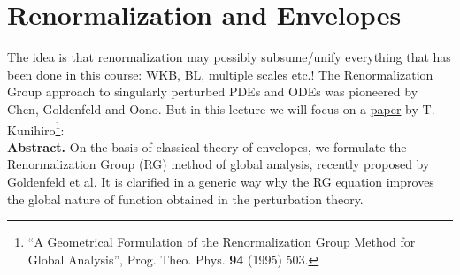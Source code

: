 \chapter{Renormalization and Envelopes}
The idea is that renormalization may possibly subsume/unify everything that has been done in this course: WKB, BL, multiple scales etc.! The Renormalization Group approach to singularly perturbed PDEs and ODEs was pioneered by Chen, Goldenfeld and Oono. But in this lecture we will focus on a \href{https://arxiv.org/abs/hep-th/9505166}{paper} by T. Kunihiro\footnote{``A Geometrical Formulation of the Renormalization Group Method for Global Analysis'', Prog. Theo. Phys. {\bf 94} (1995) 503.}: \\

 {\small {\bf Abstract. }{On the basis of classical theory of envelopes, we formulate the Renormalization Group (RG) method of global analysis, recently proposed by Goldenfeld et al. It is clarified in a generic way why the RG equation improves the global nature of function obtained in the perturbation theory. }}


